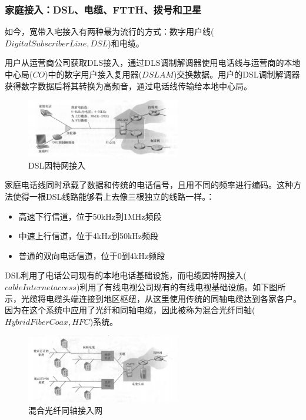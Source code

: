 \subsubsection{家庭接入：DSL、电缆、FTTH、拨号和卫星}

    如今，宽带入宅接入有两种最为流行的方式：数字用户线($Digital Subscriber Line, DSL$)和电缆。
    
    用户从运营商公司获取DLS接入，通过DLS调制解调器使用电话线与运营商的本地中心局($CO$)中的数字用户接入复用器($DSLAM$)交换数据。用户的DSL调制解调器获得数字数据后将其转换为高频音，通过电话线传输给本地中心局。

\begin{figure}[!htbp]
    \centering
    \includegraphics[width=0.6\textwidth]{image/chapter01/DLS接入.png}
    \caption{DSL因特网接入}
\end{figure}

    家庭电话线同时承载了数据和传统的电话信号，且用不同的频率进行编码。这种方法使得一根DSL线路能够看上去像三根独立的线路一样。：

\begin{itemize}
    \item 高速下行信道，位于50kHz到1MHz频段
    \item 中速上行信道，位于4kHz到50kHz频段
    \item 普通的双向电话信道，位于0到4kHz频段
\end{itemize}

    DSL利用了电话公司现有的本地电话基础设施，而电缆因特网接入($cable Internet access$)利用了有线电视公司现有的有线电视基础设施。如下图所示，光缆将电缆头端连接到地区枢纽，从这里使用传统的同轴电缆达到各家各户。因为在这个系统中应用了光纤和同轴电缆，因此被称为混合光纤同轴($Hybrid Fiber Coax, HFC$)系统。

\begin{figure}[!htbp]
    \centering
    \includegraphics[width=0.6\textwidth]{image/chapter01/电缆接入.png}
    \caption{混合光纤同轴接入网}
\end{figure}

